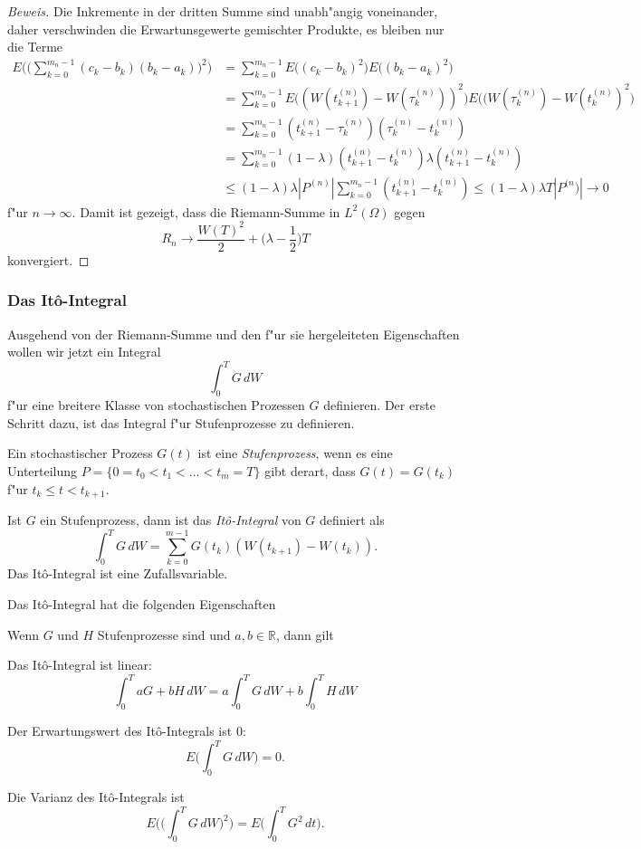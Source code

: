 \begin{proof}[Beweis]
Die Inkremente in der dritten Summe sind unabh"angig voneinander, daher
verschwinden die Erwartunsgewerte gemischter Produkte, es bleiben nur
die Terme
\begin{align*}
E\biggl(\biggl(\sum_{k=0}^{m_n-1}(c_k-b_k)(b_k-a_k)\biggr)^2\biggr)
&=
\sum_{k=0}^{m_n-1}
E\bigl((c_k-b_k)^2\bigr)E\bigl((b_k-a_k)^2\bigr)
\\
&=
\sum_{k=0}^{m_n-1}
E\bigl((W(t_{k+1}^{(n)})-W(\tau_k^{(n)}))^2\bigr)E\bigl((W(\tau_k^{(n)})-W(t_k^{(n)})^2\bigr)
\\
&=
\sum_{k=0}^{m_n-1}
(t_{k+1}^{(n)}-\tau_k^{(n)}) (\tau_k^{(n)}-t_k^{(n)})
\\
&=
\sum_{k=0}^{m_n-1}
(1-\lambda)(t_{k+1}^{(n)}-t_k^{(n)}) \lambda(t_{k+1}^{(n)}-t_k^{(n)})
\\
&\le 
(1-\lambda)\lambda
|P^{(n)}|
\sum_{k=0}^{m_n-1}
(t_{k+1}^{(n)}-t_k^{(n)})
\le (1-\lambda)\lambda T|P^{(n})|\to 0
\end{align*}
f"ur $n\to\infty$.
Damit ist gezeigt, dass die Riemann-Summe in $L^2(\Omega)$ gegen
\[
R_n\to
\frac{W(T)^2}2+\biggl(\lambda-\frac12\biggr)T
\]
konvergiert.
\end{proof}

\subsubsection{Das It\^o-Integral}
Ausgehend von der Riemann-Summe und den f"ur sie hergeleiteten Eigenschaften
wollen wir jetzt ein Integral
\[
\int_0^T G\,dW
\]
f"ur eine breitere Klasse von stochastischen Prozessen $G$ definieren.
Der erste Schritt dazu, ist das Integral f"ur Stufenprozesse zu definieren.

\begin{definition}
Ein stochastischer Prozess $G(t)$ ist eine {\em Stufenprozess}, wenn es eine
Unterteilung $P=\{0=t_0<t_1<\dots<t_m=T\}$ gibt derart, dass
$G(t)=G(t_k)$ f"ur $t_k\le t<t_{k+1}$.
\end{definition}

\begin{definition}
Ist $G$ ein Stufenprozess, dann ist das {\em It\^o-Integral} von $G$ definiert
als
\[
\int_0^TG\,dW = \sum_{k=0}^{m-1}G(t_k)(W(t_{k+1})-W(t_k)).
\]
Das It\^o-Integral ist eine Zufallsvariable.
\end{definition}

Das It\^o-Integral hat die folgenden Eigenschaften
\begin{hilfssatz}
Wenn $G$ und $H$ Stufenprozesse sind und $a,b\in\mathbb R$, dann gilt
\begin{compactenum}
\item Das It\^o-Integral ist linear:
\[
\int_0^T aG+bH\,dW
=
a\int_0^T G\,dW + b \int_0^TH\,dW
\]
\item Der Erwartungswert des It\^o-Integrals ist $0$:
\[
E\biggl(\int_0^T G\,dW\biggr)=0.
\]
\item Die Varianz des It\^o-Integrals ist
\[
E\biggl(\biggl(\int_0^T G\,dW\biggr)^2\biggr)
=
E\biggl(\int_0^T G^2\,dt\biggr).
\]
\end{compactenum}
\end{hilfssatz}

